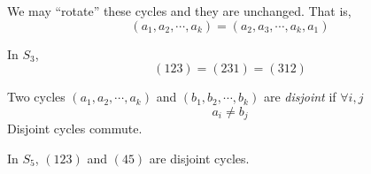 \documentclass{article}
\begin{document}

\begin{remark}
    We may ``rotate'' these cycles and they are unchanged. That is,
    \[
        (a_1, a_2, \cdots, a_k) = (a_2, a_3, \cdots, a_k, a_1)  
    \]
\end{remark}
\begin{eg}
    In $S_3$,
    \[
        (1 2 3) = (2 3 1) = (3 1 2)  
    \]
\end{eg}

\begin{defi}
    Two cycles $(a_1, a_2, \cdots, a_k)$ and $(b_1, b_2, \cdots, b_k)$ are \emph{disjoint} if $\forall i, j$
    \[
        a_i \neq b_j  
    \]
    Disjoint cycles commute.
\end{defi}
\begin{eg}
    In $S_5$, $(1 2 3)$ and $(4 5)$ are disjoint cycles.
\end{eg}
\end{document}
